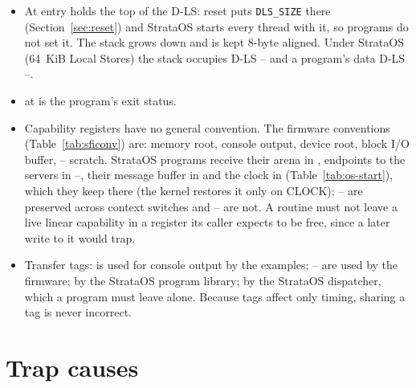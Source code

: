 \begin{itemize}
\item At entry  holds the top of the D-LS: reset puts \texttt{DLS\_SIZE} there
  (Section~\ref{sec:reset}) and StrataOS starts every thread with it, so programs do not set it. The
  stack grows down and is kept 8-byte aligned. Under StrataOS (64~KiB Local Stores) the stack occupies
  D-LS -- and a program's data D-LS --.
\item {} at  is the program's exit status.
\item Capability registers have no general convention. The firmware conventions
  (Table~\ref{tab:sficonv}) are:  memory root,  console output,  device root,
   block I/O buffer, -- scratch. StrataOS programs receive their arena in
  , endpoints to the servers in --, their message buffer in  and the
  clock in  (Table~\ref{tab:os-start}), which they keep there (the kernel restores it only on
  CLOCK); -- are preserved across context switches
  and -- are not. A routine must not leave a live linear
  capability in a register its caller expects to be free, since a later write to it would trap.
\item Transfer tags:  is used for console output by the examples; -- are
  used by the firmware;  by the StrataOS program library;  by the StrataOS
  dispatcher, which a program must leave alone. Because tags affect only timing, sharing a tag is never incorrect.
\end{itemize}

\chapter{Trap causes}\label{app:causes}


